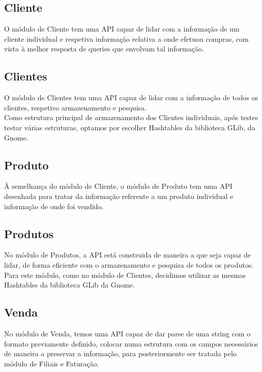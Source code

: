 \documentclass[a4paper]{report}
\begin{document}
\subsection{Cliente}

O módulo de Cliente tem uma API capaz de lidar com a informação de um cliente
individual e respetiva informação relativa a onde efetuou compras, com vista
à melhor resposta de queries que envolvam tal informação.

\subsection{Clientes}

O módulo de Clientes tem uma API capaz de lidar com a informação de todos os
clientes, respetivo armazenamento e pesquisa. \\ 
Como estrutura principal de armazenamento dos Clientes individuais, após testes 
testar várias estruturas, optamos por escolher Hashtables da biblioteca GLib, 
da Gnome.

\subsection{Produto}

À semelhança do módulo de Cliente, o módulo de Produto tem uma API desenhada
para tratar da informação referente a um produto individual e informação de 
onde foi vendido.

\subsection{Produtos}

No módulo de Produtos, a API está construida de maneira a que seja capaz de
lidar, de forma eficiente com o armazenamento e pesquisa de todos os produtos.\\
Para este módulo, como no módulo de Clientes, decidimos utilizar as mesmas Hashtables
da biblioteca GLib da Gnome.

\subsection{Venda}

No módulo de Venda, temos uma API capaz de dar parse de uma string com o formato 
previamente definido, colocar numa estrutura com os campos necessários de maneira
a preservar a informação, para posteriormente ser tratada pelo módulo de Filiais e
Faturação.
\end{document}
